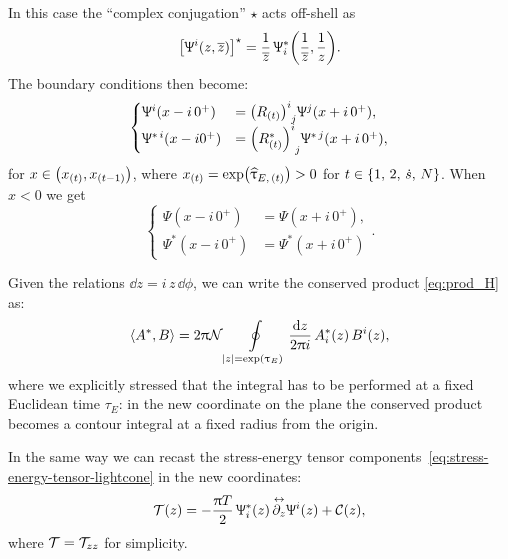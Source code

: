 In this case the ``complex conjugation'' $\star$ acts off-shell as
\begin{equation}
  \qty[ \Uppsi^i( z, \overline{z} ) ]^\star
  =
  \frac{1}{\overline{z}}\, \Uppsi_i^*\qty(\frac{1}{\overline{z}}, \frac{1}{z}).
  \label{eq:complex-plane-conjugate}
\end{equation}
The boundary conditions then become:
\begin{equation}
  \begin{cases}
    \Psi^i( x - i\, 0^+ )
    & =
    \tensor{\qty( R_{(t)} )}{^i_j} \Psi^j( x + i\, 0^+ ),
    \\
    \Psi^{*\, i}( x - i 0^+ )
    & =
    \tensor{\qty( R_{(t)}^* )}{^i_j} \Psi^{*\, j}( x + i\, 0^+ ),
  \end{cases}
  \label{eq:boundary-condition-euclidean}
\end{equation}
for $x \in \qty( x_{(t)}, x_{(t-1)} )$, where $x_{(t)} = \exp( \widehat{\uptau}_{E,\, (t)} ) > 0$ for $t \in \qty{ 1,\, 2,\, \ensuremath{\dot{s}},\, N }$.
When $x < 0$ we get
\begin{equation}
  \begin{cases}
    \Psi( x - i\, 0^+ ) & = \Psi( x + i\, 0^+ ),
    \\
    \Psi^*( x - i\, 0^+ ) & = \Psi^*( x + i\, 0^+ )
  \end{cases}.
  \label{eq:gluing-conditions-euclidean}
\end{equation}

Given the relations $\dd{z} = i\, z\, \dd{\phi}$, we can write the conserved product \eqref{eq:prod_H} as:
\begin{equation}
  \left\langle A^*, B \right\rangle
  =
  2\uppi \mathcal{N}
  \oint\limits_{\abs{z} = \exp( \uptau_E )}
  \frac{\dd{z}}{2 \uppi i}\, A^*_i( z )\, B^i( z ),
  \label{eq:conserved-product-complex-plane}
\end{equation}
where we explicitly stressed that the integral has to be performed at a fixed Euclidean time $\tau_E$: in the new coordinate on the plane the conserved product becomes a contour integral at a fixed radius from the origin.

In the same way we can recast the stress-energy tensor components~\eqref{eq:stress-energy-tensor-lightcone} in the new coordinates:
\begin{equation}
  \mathcal{T}( z )
  =
  - \frac{\uppi T}{2}\,
  \Uppsi^*_i( z )\, \overset{\leftrightarrow}{\partial_{z}} \Uppsi^i( z )
  +
  \mathcal{C}( z ),
\end{equation}
where $\mathcal{T} = \mathcal{T}_{zz}$ for simplicity.

